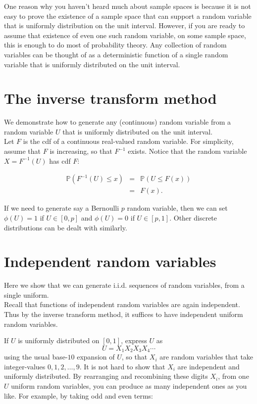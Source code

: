 \documentclass[
]{article}
\theoremstyle{definition}
\theoremstyle{definition}
\theoremstyle{definition}
\theoremstyle{remark}
\begin{document}
One reason why you haven't heard much about sample spaces is because it is not easy to prove the existence of a sample space that can support a random variable that is uniformly distribution on the unit interval. However, if you are ready to assume that existence of even one such random variable, on some sample space, this is enough to do most of probability theory. Any collection of random variables can be thought of as a deterministic function of a single random variable that is uniformly distributed on the unit interval.

\hypertarget{the-inverse-transform-method}{%
\section{The inverse transform method}\label{the-inverse-transform-method}}

We demonstrate how to generate any (continuous) random variable from a random variable \(U\) that is uniformly distributed on the unit interval.\\
Let \(F\) is the cdf of a continuous real-valued random variable. For simplicity, assume that \(F\) is increasing, so that \(F^{-1}\) exists.
Notice that the random variable \(X=F^{-1}(U)\) has cdf \(F\):

\begin{eqnarray*}
\mathbb{P}( F^{-1}(U) \leq x) &=&  \mathbb{P}(U \leq F(x)) \\
&=&  F(x).
\end{eqnarray*}

If we need to generate say a Bernoulli \(p\) random variable, then we can set \(\phi(U) = 1\) if \(U \in [0,p]\) and \(\phi(U)=0\) if \(U \in [p, 1]\). Other discrete distributions can be dealt with similarly.

\hypertarget{independent-random-variables}{%
\section{Independent random variables}\label{independent-random-variables}}

Here we show that we can generate i.i.d. sequences of random variables, from a single uniform.\\
Recall that functions of independent random variables are again independent. Thus by the inverse transform method, it suffices to have independent uniform random variables.

If \(U\) is uniformly distributed on \([0,1]\), express \(U\) as
\[ U= X_1 X_2 X_3 X_4 \cdots\]
using the usual base-\(10\) expansion of \(U\), so that \(X_i\) are random variables that take integer-values \(0,1,2, \ldots, 9\). It is not hard to show that \(X_i\) are independent and uniformly distributed. By rearranging and recombining these digits \(X_i\), from one \(U\) uniform random variables, you can produce as many independent ones as you like. For example, by taking odd and even terms:
\end{document}
